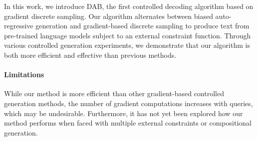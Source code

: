 In this work, we introduce DAB, the first controlled decoding algorithm based on gradient discrete sampling. 
Our algorithm alternates between biased auto-regressive generation and gradient-based discrete sampling to produce text from pre-trained language models subject to an external constraint function. 
Through various controlled generation experiments, we demonstrate that our algorithm is both more efficient and effective than previous methods. 

\paragraph{Limitations} While our method is more efficient than other gradient-based controlled generation methods, the number of gradient computations increases with queries, which may be undesirable. Furthermore, it has not yet been explored how our method performs when faced with multiple external constraints or compositional generation. 